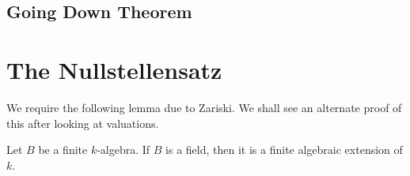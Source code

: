 \subsection{Going Down Theorem}

\section{The Nullstellensatz}

We require the following lemma due to Zariski. We shall see an alternate proof of this after looking at valuations.

\begin{lemma}
    Let $B$ be a finite $k$-algebra. If $B$ is a field, then it is a finite algebraic extension of $k$.
\end{lemma}

\begin{theorem}
    
\end{theorem}